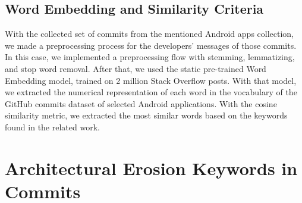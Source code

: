 \subsection{Word Embedding and Similarity Criteria}
With the collected set of commits from the mentioned Android apps collection, we made a preprocessing process for the developers' messages of those commits. In this case, we implemented a preprocessing flow with stemming, lemmatizing, and stop word removal. After that, we used the static pre-trained Word Embedding model, trained on 2 million Stack Overflow posts. With that model, we extracted the numerical representation of each word in the vocabulary of the GitHub commits dataset of selected Android applications. With the cosine similarity metric, we extracted the most similar words based on the keywords found in the related work.



\section{Architectural Erosion Keywords in Commits}
